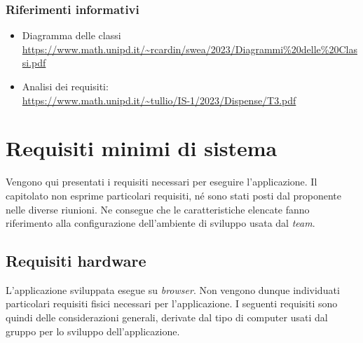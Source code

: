 \documentclass[5pt]{article}
\begin{document}
        \subsubsection{Riferimenti informativi}
        \begin{itemize}
         	\item Diagramma delle classi \\ \url{https://www.math.unipd.it/~rcardin/swea/2023/Diagrammi%20delle%20Classi.pdf}
         	\item Analisi dei requisiti: \\ \url{https://www.math.unipd.it/~tullio/IS-1/2023/Dispense/T3.pdf}
        \end{itemize}
        


	\section{Requisiti minimi di sistema}
		Vengono qui presentati i requisiti necessari per eseguire l'applicazione. Il capitolato non esprime particolari requisiti, né sono stati posti dal proponente nelle diverse riunioni. 
		Ne consegue che le caratteristiche elencate fanno riferimento alla configurazione dell'ambiente di sviluppo usata dal \textit{team}.
              
		\subsection{Requisiti hardware}
			L'applicazione sviluppata esegue su \textit{browser}. Non vengono dunque individuati particolari requisiti fisici
			necessari per l'applicazione. I seguenti requisiti sono quindi delle considerazioni generali, derivate dal tipo di computer usati dal gruppo per lo sviluppo dell'applicazione. 
			\begin{table}[H]
				\centering
				\caption{Requisiti Hardware}
			\end{table}
\end{document}

